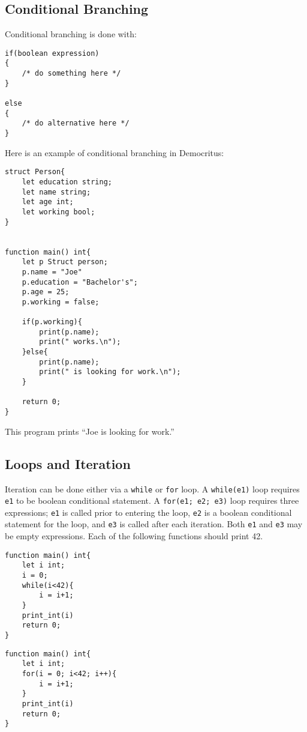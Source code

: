 	\subsection{Conditional Branching}
		Conditional branching is done with:

		\begin{lstlisting}
if(boolean expression) 
{ 
	/* do something here */
}

else
{
	/* do alternative here */
}
		\end{lstlisting}
	
		\medskip \noindent
		Here is an example of conditional branching in Democritus:

		\begin{lstlisting}
struct Person{
	let education string;
	let name string;
	let age int;
	let working bool;
}


function main() int{
	let p Struct person;
	p.name = "Joe"
	p.education = "Bachelor's";
	p.age = 25;
	p.working = false;

	if(p.working){
		print(p.name);
		print(" works.\n");
	}else{
		print(p.name);
		print(" is looking for work.\n");
	}

	return 0;
}
		\end{lstlisting}

		\medskip \noindent
		This program prints ``Joe is looking for work.''

	\subsection{Loops and Iteration}
		Iteration can be done either via a \texttt{while} or \texttt{for} loop. A \texttt{while(e1)} loop requires \texttt{e1} to be boolean conditional statement. A \texttt{for(e1; e2; e3)} loop requires three expressions; \texttt{e1} is called prior to entering the loop, \texttt{e2} is a boolean conditional statement for the loop, and \texttt{e3} is called after each iteration. Both \texttt{e1} and \texttt{e3} may be empty expressions. Each of the following functions should print 42.

		\begin{lstlisting}
function main() int{
	let i int;
	i = 0;
	while(i<42){
		i = i+1;
	}
	print_int(i)
	return 0;
}
		\end{lstlisting}

		\begin{lstlisting}
function main() int{
	let i int;
	for(i = 0; i<42; i++){
		i = i+1;
	}
	print_int(i)
	return 0;
}
		\end{lstlisting}



